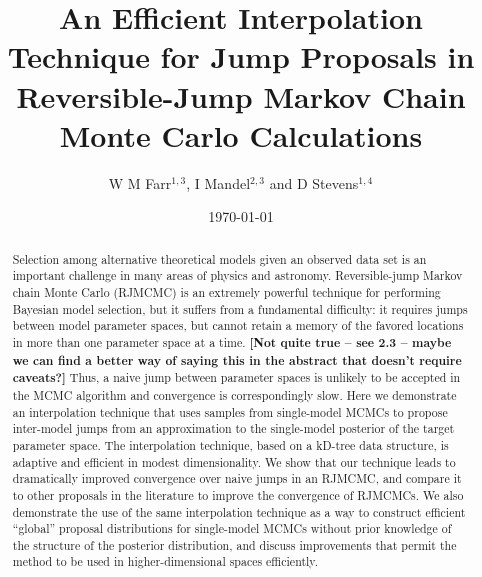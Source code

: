 \documentclass{iopart}
\newcommand{\ilya}[1]{{\color{red} \bf #1}}
\begin{document}
\title[Efficient Jump Proposals in RJMCMC]{An Efficient Interpolation
  Technique for Jump Proposals in Reversible-Jump Markov Chain Monte
  Carlo Calculations}

\date{\today}

\author{W M Farr$^{1,3}$, I Mandel$^{2,3}$ and D Stevens$^{1,4}$}

\address{$^1$ Center for Interdisciplinary Exploration and Research in
  Astrophysics (CIERA), Department of Physics and Astronomy,
  Northwestern University, Evanston IL USA}

\address{$^2$ MIT Kavli Institute, Cambridge MA USA}

\address{$^3$ School of Physics and Astronomy, University of
  Birmingham, Birmingham UK}

\address{$^4$ Department of Astronomy, The Ohio State
  University, Columbus OH USA}



\begin{abstract}
  Selection among alternative theoretical models given an observed
  data set is an important challenge in many areas of physics and
  astronomy.  Reversible-jump Markov chain Monte Carlo (RJMCMC) is an
  extremely powerful technique for performing Bayesian model
  selection, but it suffers from a fundamental difficulty: it requires
  jumps between model parameter spaces, but cannot retain a memory of
  the favored locations in more than one parameter space at a time. \ilya{[Not quite true -- see 2.3 -- maybe we can find a better way of saying this in the abstract that doesn't require caveats?]}
  Thus, a naive jump between parameter spaces is unlikely to be
  accepted in the MCMC algorithm and convergence is correspondingly
  slow.  Here we demonstrate an interpolation technique that uses
  samples from single-model MCMCs to propose inter-model jumps from an
  approximation to the single-model posterior of the target parameter
  space.  The interpolation technique, based on a kD-tree data
  structure, is adaptive and efficient in modest dimensionality.  We
  show that our technique leads to dramatically improved convergence
  over naive jumps in an RJMCMC, and compare it to other proposals in
  the literature to improve the convergence of RJMCMCs.  We also
  demonstrate the use of the same interpolation technique as a way to
  construct efficient ``global'' proposal distributions for
  single-model MCMCs without prior knowledge of the structure of the
  posterior distribution, and discuss improvements that permit the
  method to be used in higher-dimensional spaces efficiently.
\end{abstract}
\end{document}
